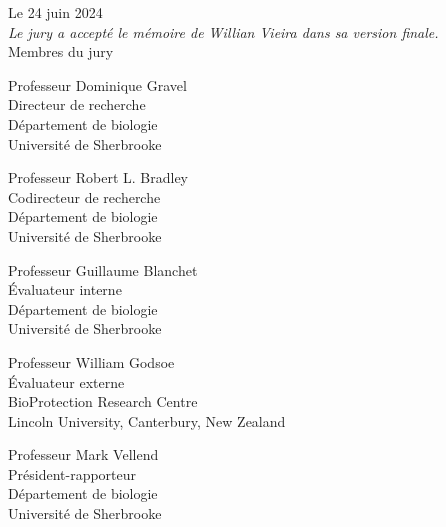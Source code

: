 \documentclass[12pt,oneside]{book}
\newcommand{\blankpage}{	%
\newpage
\thispagestyle{empty}
\mbox{}
\newpage
}
\begin{document}
\blankpage
\singlespacing
\begin{center}
Le 24 juin 2024\\   \vspace{1cm} %
\textit{Le jury a accepté le mémoire de Willian Vieira dans sa version finale.}\\  \vspace{1cm}
Membres du jury\\  \vspace{1cm}

Professeur Dominique Gravel\\
Directeur de recherche\\
Département de biologie\\
Université de Sherbrooke\\ \vspace{13mm}

Professeur Robert L. Bradley\\
Codirecteur de recherche\\
Département de biologie\\
Université de Sherbrooke\\ \vspace{13mm}

Professeur Guillaume Blanchet \\
Évaluateur interne\\
Département de biologie\\
Université de Sherbrooke\\ \vspace{13mm}

Professeur William Godsoe\\
Évaluateur externe\\
BioProtection Research Centre\\
Lincoln University, Canterbury, New Zealand\\ \vspace{13mm}

Professeur Mark Vellend\\
Président-rapporteur\\
Département de biologie\\
Université de Sherbrooke\\ \vspace{13mm}
\end{center}



\end{document}
